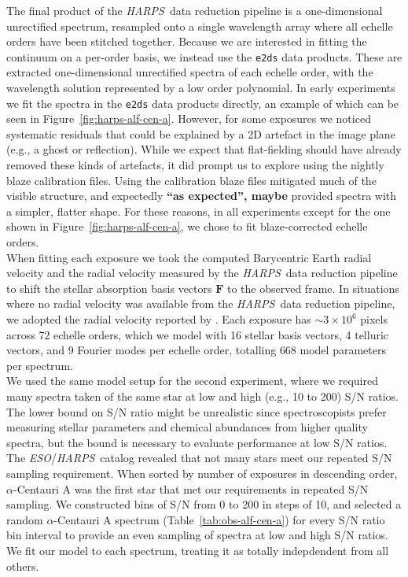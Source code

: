\documentclass[modern]{aastex631}
\newcommand{\project}[1]{\textit{#1}}
\renewcommand{\vec}[1]{\mathbf{#1}}
\newcommand{\eso}{\project{ESO}}
\newcommand{\harps}{\project{HARPS}}
\newcommand{\todo}[1]{\textcolor{tab:red}{#1}}
\newcommand{\ajw}[1]{\textbf{#1}}
\begin{document}
The final product of the \harps\ data reduction pipeline is a one-dimensional unrectified spectrum, resampled onto a single wavelength array where all echelle orders have been stitched together. Because we are interested in fitting the continuum on a per-order basis, we instead use the \texttt{e2ds} data products. These are extracted one-dimensional unrectified spectra of each echelle order, with the wavelength solution represented by a low order polynomial. In early experiments we fit the spectra in the \texttt{e2ds} data products directly, an example of which can be seen in Figure~\ref{fig:harps-alf-cen-a}. However, for some exposures we noticed systematic residuals that could be explained by a 2D artefact in the image plane (e.g., a ghost or reflection). While we expect that flat-fielding should have already removed these kinds of artefacts, it did prompt us to explore using the nightly blaze calibration files. Using the calibration blaze files mitigated much of the visible structure, and expectedly \ajw{``as expected'', maybe} provided spectra with a simpler, flatter shape. For these reasons, in all experiments except for the one shown in Figure~\ref{fig:harps-alf-cen-a}, we chose to fit blaze-corrected echelle orders.\\

When fitting each exposure we took the computed Barycentric Earth radial velocity and the radial velocity measured by the \harps\ data reduction pipeline to shift the stellar absorption basis vectors $\vec{F}$ to the observed frame. In situations where no radial velocity was available from the \harps\ data reduction pipeline, we adopted the radial velocity reported by \citep{Someone}. Each exposure has $\sim3\times10^6$ pixels across 72 echelle orders, which we model with 16 stellar basis vectors, 4 telluric vectors, and \todo{9} Fourier modes per echelle order, totalling \todo{668} model parameters per spectrum.\\

We used the same model setup for the second experiment, where we required many spectra taken of the same star at low and high (e.g., 10 to 200) S/N ratios. The lower bound on S/N ratio might be unrealistic since spectroscopists prefer measuring stellar parameters and chemical abundances from higher quality spectra, but the bound is necessary to evaluate performance at low S/N ratios. The \eso/\harps\ catalog revealed that not many stars meet our repeated S/N sampling requirement. When sorted by number of exposures in descending order, $\alpha$-Centauri A was the first star that met our requirements in repeated S/N sampling. We constructed bins of S/N from 0 to 200 in steps of 10, and selected a random $\alpha$-Centauri A spectrum (Table~\ref{tab:obs-alf-cen-a}) for every S/N ratio bin interval to provide an even sampling of spectra at low and high S/N ratios. We fit our model to each spectrum, treating it as totally indepdendent from all others.\\
\end{document}
